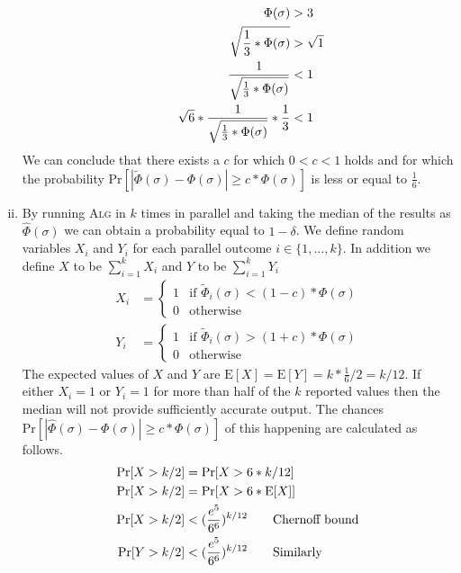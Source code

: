 \begin{enumerate}[(i)]
\[\begin{split}
\end{split}
\hspace*{20px}
\begin{split}
\Phi(\sigma) &> 3\\
\sqrt{\frac{1}{3} * \Phi(\sigma)} &> \sqrt{1}\\
\frac{1}{\sqrt{\frac{1}{3} * \Phi(\sigma)}} &< 1\\
\sqrt{6} * \frac{1}{\sqrt{\frac{1}{3} * \Phi(\sigma)}} * \frac{1}{3} &< 1 \\
\end{split}
\]
We can conclude that there exists a $c$ for which $0 < c < 1$ holds and for which the probability $\text{Pr}[|\tilde{\Phi}(\sigma) - \Phi(\sigma)| \geq c * \Phi(\sigma)]$ is less or equal to $\frac{1}{6}$.
	\item
By running \textsc{Alg} in $k$ times in parallel and taking the median of the results as $\hat{\Phi}(\sigma)$ we can obtain a probability equal to $1-\delta$.
We define random variables $X_i$ and $Y_i$ for each parallel outcome $i\in \{1, \ldots , k\}$. In addition we define $X$ to be $\sum^k_{i=1}X_i$ and $Y$ to be $\sum^k_{i=1}Y_i$
\[
\begin{split}
X_i &= 
\begin{cases}
1 & \text{if $\tilde{\Phi}_i(\sigma) < (1-c) * \Phi(\sigma)$}\\
0 & \text{otherwise}
\end{cases}\\
Y_i &= 
\begin{cases}
1 & \text{if $\tilde{\Phi}_i(\sigma) > (1+c) * \Phi(\sigma)$}\\
0 & \text{otherwise}
\end{cases}
\end{split}
\]
The expected values of $X$ and $Y$ are $\text{E}[X] = \text{E}[Y] = k*\frac{1}{6} / 2 = k/12$.
If either $X_i  = 1$ or $Y_i = 1$ for more than half of the $k$ reported values then the median will not provide sufficiently accurate output.
The chances $\text{Pr}[|\hat{\Phi}(\sigma) - \Phi(\sigma)| \geq c * \Phi(\sigma)]$ of this happening are calculated as follows.
\[
\begin{split}
\text{Pr}[X > k/2] &= \text{Pr}[X > 6 * k/12]\\
\text{Pr}[X > k/2] &= \text{Pr}[X > 6 * \text{E}[X]]\\
\text{Pr}[X > k/2] &< (\frac{e^5}{6^6})^{k/12} \hspace*{20px}\text{Chernoff bound}\\
\text{Pr}[Y > k/2] &< (\frac{e^5}{6^6})^{k/12} \hspace*{20px}\text{Similarly}\\

\end{split}\]
\end{enumerate}
